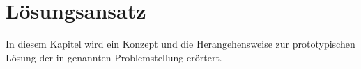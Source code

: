 \chapter{Lösungsansatz}
\label{chap:loesung}
In diesem Kapitel wird ein Konzept und die Herangehensweise zur prototypischen Lösung der in  genannten Problemstellung erörtert.





